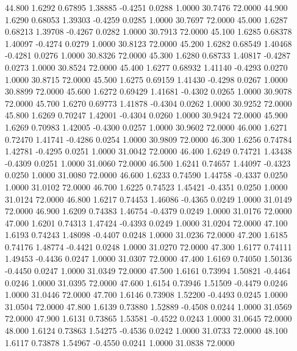  44.800   1.6292   0.67895   1.38885  -0.4251   0.0288   1.0000  30.7476  72.0000
  44.900   1.6290   0.68053   1.39303  -0.4259   0.0285   1.0000  30.7697  72.0000
  45.000   1.6287   0.68213   1.39708  -0.4267   0.0282   1.0000  30.7913  72.0000
  45.100   1.6285   0.68378   1.40097  -0.4274   0.0279   1.0000  30.8123  72.0000
  45.200   1.6282   0.68549   1.40468  -0.4281   0.0276   1.0000  30.8326  72.0000
  45.300   1.6280   0.68733   1.40817  -0.4287   0.0273   1.0000  30.8524  72.0000
  45.400   1.6277   0.68932   1.41140  -0.4293   0.0270   1.0000  30.8715  72.0000
  45.500   1.6275   0.69159   1.41430  -0.4298   0.0267   1.0000  30.8899  72.0000
  45.600   1.6272   0.69429   1.41681  -0.4302   0.0265   1.0000  30.9078  72.0000
  45.700   1.6270   0.69773   1.41878  -0.4304   0.0262   1.0000  30.9252  72.0000
  45.800   1.6269   0.70247   1.42001  -0.4304   0.0260   1.0000  30.9424  72.0000
  45.900   1.6269   0.70983   1.42005  -0.4300   0.0257   1.0000  30.9602  72.0000
  46.000   1.6271   0.72470   1.41741  -0.4286   0.0254   1.0000  30.9809  72.0000
  46.300   1.6256   0.74784   1.42781  -0.4295   0.0251   1.0000  31.0042  72.0000
  46.400   1.6249   0.74721   1.43438  -0.4309   0.0251   1.0000  31.0060  72.0000
  46.500   1.6241   0.74657   1.44097  -0.4323   0.0250   1.0000  31.0080  72.0000
  46.600   1.6233   0.74590   1.44758  -0.4337   0.0250   1.0000  31.0102  72.0000
  46.700   1.6225   0.74523   1.45421  -0.4351   0.0250   1.0000  31.0124  72.0000
  46.800   1.6217   0.74453   1.46086  -0.4365   0.0249   1.0000  31.0149  72.0000
  46.900   1.6209   0.74383   1.46754  -0.4379   0.0249   1.0000  31.0176  72.0000
  47.000   1.6201   0.74313   1.47424  -0.4393   0.0249   1.0000  31.0204  72.0000
  47.100   1.6193   0.74243   1.48098  -0.4407   0.0248   1.0000  31.0236  72.0000
  47.200   1.6185   0.74176   1.48774  -0.4421   0.0248   1.0000  31.0270  72.0000
  47.300   1.6177   0.74111   1.49453  -0.4436   0.0247   1.0000  31.0307  72.0000
  47.400   1.6169   0.74050   1.50136  -0.4450   0.0247   1.0000  31.0349  72.0000
  47.500   1.6161   0.73994   1.50821  -0.4464   0.0246   1.0000  31.0395  72.0000
  47.600   1.6154   0.73946   1.51509  -0.4479   0.0246   1.0000  31.0446  72.0000
  47.700   1.6146   0.73908   1.52200  -0.4493   0.0245   1.0000  31.0504  72.0000
  47.800   1.6139   0.73880   1.52889  -0.4508   0.0244   1.0000  31.0569  72.0000
  47.900   1.6131   0.73865   1.53581  -0.4522   0.0243   1.0000  31.0645  72.0000
  48.000   1.6124   0.73863   1.54275  -0.4536   0.0242   1.0000  31.0733  72.0000
  48.100   1.6117   0.73878   1.54967  -0.4550   0.0241   1.0000  31.0838  72.0000

